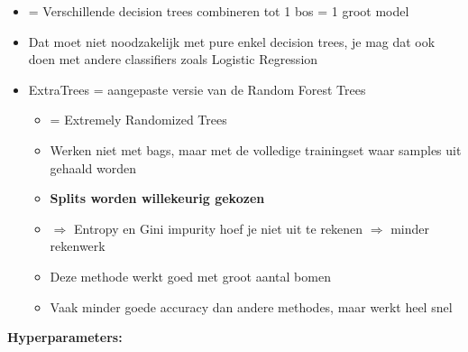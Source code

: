 \documentclass{article}
\begin{document}
\begin{itemize}
    \item = Verschillende decision trees combineren tot 1 bos = 1 groot model
    \item Dat moet niet noodzakelijk met pure enkel decision trees, je mag dat ook doen met andere classifiers zoals Logistic Regression
    \item ExtraTrees = aangepaste versie van de Random Forest Trees
    \begin{itemize}
        \item = Extremely Randomized Trees
        \item Werken niet met bags, maar met de volledige trainingset waar samples uit gehaald worden
        \item \textbf{Splits worden willekeurig gekozen}
        \item $\Rightarrow$ Entropy en Gini impurity hoef je niet uit te rekenen $\Rightarrow$ minder rekenwerk
        \item Deze methode werkt goed met groot aantal bomen
        \item Vaak minder goede accuracy dan andere methodes, maar werkt heel snel
    \end{itemize}
\end{itemize}

\textbf{Hyperparameters:}
\end{document}
